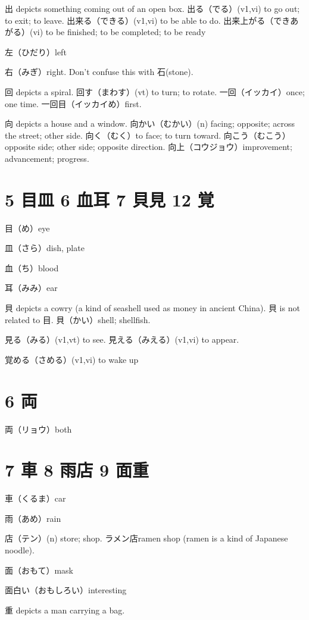 出 depicts something coming out of an open box.
出る（でる）(v1,vi) to go out; to exit; to leave.
出来る（できる）(v1,vi) to be able to do.
出来上がる（できあがる）(vi) to be finished; to be completed; to be ready

左（ひだり）left

右（みぎ）right.
Don't confuse this with 石(stone).

回 depicts a spiral.
回す（まわす）(vt) to turn; to rotate.
一回（イッカイ）once; one time.
一回目（イッカイめ）first.

向 depicts a house and a window.
向かい（むかい）(n) facing; opposite; across the street; other side.
向く（むく）to face; to turn toward.
向こう（むこう）opposite side; other side; opposite direction.
向上（コウジョウ）improvement; advancement; progress.

\section{5 目皿 6 血耳 7 貝見 12 覚}

目（め）eye

皿（さら）dish, plate

血（ち）blood

耳（みみ）ear

貝 depicts a cowry (a kind of seashell used as money in ancient China).
貝 is not related to 目.
貝（かい）shell; shellfish.

見る（みる）(v1,vt) to see.
見える（みえる）(v1,vi) to appear.

覚める（さめる）(v1,vi) to wake up

\section{6 両}

両（リョウ）both

\section{7 車 8 雨店 9 面重}

車（くるま）car

雨（あめ）rain

店（テン）(n) store; shop.
ラメン店ramen shop (ramen is a kind of Japanese noodle).

面（おもて）mask

面白い（おもしろい）interesting

重 depicts a man carrying a bag.

